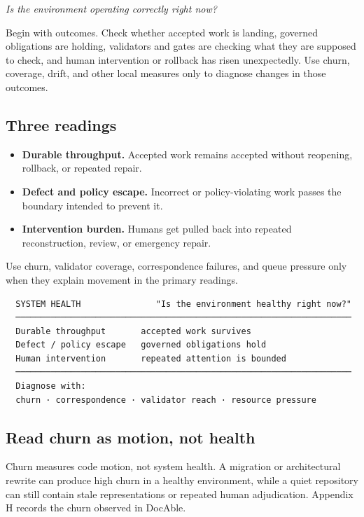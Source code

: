 
\emph{Is the environment operating correctly right now?}

Begin with outcomes. Check whether accepted work is landing, governed obligations are holding, validators and gates are checking what they are supposed to check, and human intervention or rollback has risen unexpectedly. Use churn, coverage, drift, and other local measures only to diagnose changes in those outcomes.

\subsection{Three readings}\label{heading:three-readings}

\begin{itemize}
\tightlist
\item
  \textbf{Durable throughput.} Accepted work remains accepted without reopening, rollback, or repeated repair.
\item
  \textbf{Defect and policy escape.} Incorrect or policy-violating work passes the boundary intended to prevent it.
\item
  \textbf{Intervention burden.} Humans get pulled back into repeated reconstruction, review, or emergency repair.
\end{itemize}

Use churn, validator coverage, correspondence failures, and queue pressure only when they explain movement in the primary readings.

\begin{verbatim}
  SYSTEM HEALTH               "Is the environment healthy right now?"
  ───────────────────────────────────────────────────────────────────
  Durable throughput       accepted work survives
  Defect / policy escape   governed obligations hold
  Human intervention       repeated attention is bounded
  ───────────────────────────────────────────────────────────────────
  Diagnose with:
  churn · correspondence · validator reach · resource pressure
\end{verbatim}

\subsection{Read churn as motion, not health}\label{heading:read-churn-as-motion-not-health}

Churn measures code motion, not system health. A migration or architectural rewrite can produce high churn in a healthy environment, while a quiet repository can still contain stale representations or repeated human adjudication. Appendix H records the churn observed in DocAble.
